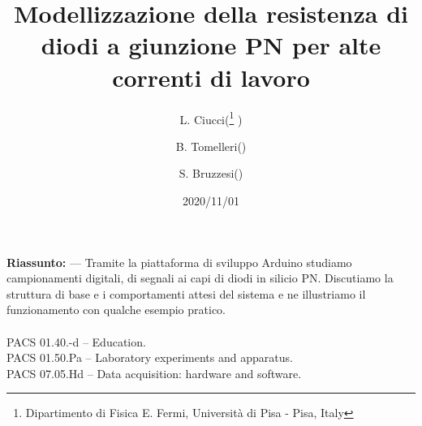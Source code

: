 \documentclass{article}[a4paper, oneside ,11pt]
\title{Modellizzazione della resistenza di diodi a giunzione PN per alte correnti di lavoro}
\author{L. Ciucci(\thanks{Dipartimento di Fisica E. Fermi, Universit\`a di Pisa - Pisa, Italy} ) \and B. Tomelleri(\protect\footnotemark[1] ) \and S. Bruzzesi(\protect\footnotemark[1] )}
\date{2020/11/01}
\begin{document}
\maketitle
\begin{mdframed}
\textbf{Riassunto:} --- Tramite la piattaforma di sviluppo Arduino\cite{arduino} studiamo campionamenti digitali, di segnali ai capi di diodi in silicio PN. Discutiamo la struttura di base e i comportamenti attesi del sistema e ne illustriamo il funzionamento con qualche esempio pratico.\\\\
PACS 01.40.-d – Education.\\
PACS 01.50.Pa – Laboratory experiments and apparatus.\\
PACS 07.05.Hd – Data acquisition: hardware and software.
\end{mdframed}
\end{document}
